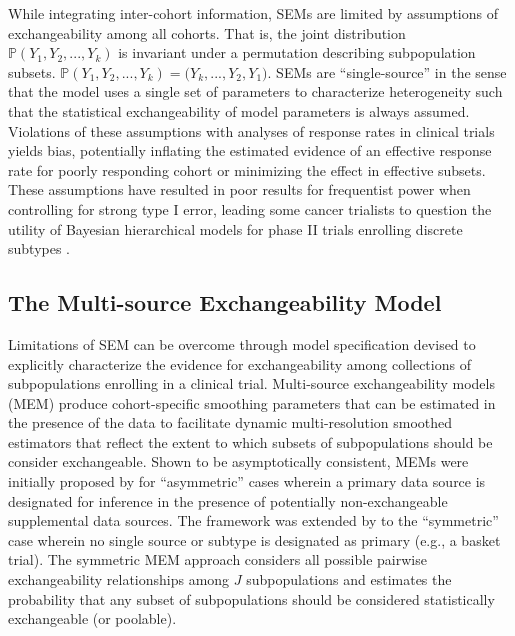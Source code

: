 While integrating inter-cohort information, SEMs are limited by assumptions of exchangeability among all cohorts. That is, the joint distribution $\mathbb{P}(Y_1, Y_2, ..., Y_k)$ is invariant under a permutation describing subpopulation subsets. $\mathbb{P}(Y_1, Y_2, ..., Y_k) = \mathbb(Y_k, ..., Y_2, Y_1)$. SEMs are ``single-source'' in the sense that the model uses a single set of parameters to characterize heterogeneity such that the statistical exchangeability of model parameters is always assumed. Violations of these assumptions with analyses of response rates in clinical trials yields bias, potentially inflating the estimated evidence of an effective response rate for poorly responding cohort or minimizing the effect in effective subsets. These assumptions have resulted in poor results for frequentist power when controlling for strong type I error, leading some cancer trialists to question the utility of Bayesian hierarchical models for phase II trials enrolling discrete subtypes \citep{freidlin2013ccr,Cunananetal17specifying}.

\subsection{The Multi-source Exchangeability Model}

Limitations of SEM can be overcome through model specification devised to explicitly characterize the evidence for exchangeability among collections of subpopulations enrolling in a clinical trial. %
Multi-source exchangeability models (MEM) produce cohort-specific smoothing parameters that can be estimated in the presence of the data to facilitate dynamic multi-resolution smoothed estimators that reflect the extent to which subsets of subpopulations should be consider exchangeable. Shown to be asymptotically consistent, MEMs were initially proposed by \cite{kaizer2017} for ``asymmetric'' cases wherein a primary data source is designated for inference in the presence of potentially non-exchangeable supplemental data sources. %
The framework was extended by \cite{hobbs2018monitor} to the ``symmetric'' case wherein no single source or subtype is designated as primary (e.g., a basket trial). The symmetric MEM approach considers all possible pairwise exchangeability relationships among $J$ subpopulations and estimates the probability that any subset of subpopulations should be considered statistically exchangeable (or poolable). %

